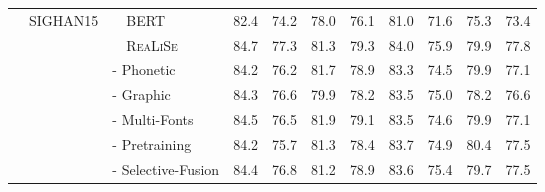 \documentclass[11pt,a4paper]{article}
\newcommand\model{\textsc{ReaLiSe}}
\begin{document}
\begin{table*}[t]
\begin{tabular}{@{}l|@{}l|cccc|cccc}
\midrule

\multirow{7}{*}{~~SIGHAN15} & ~~BERT & 82.4 & 74.2 & 78.0 & 76.1 & 81.0 & 71.6 & 75.3 & 73.4 \\
& ~~\model{} & 84.7 & 77.3 & 81.3 & 79.3 & 84.0 & 75.9 & 79.9 & 77.8 \\
& \quad- Phonetic & 84.2 & 76.2 & 81.7 & 78.9 & 83.3 & 74.5 & 79.9 & 77.1 \\
& \quad- Graphic & 84.3 & 76.6 & 79.9 & 78.2 & 83.5 & 75.0 & 78.2 & 76.6 \\
& \quad- Multi-Fonts & 84.5 & 76.5 & 81.9 & 79.1 & 83.5 & 74.6 & 79.9 & 77.1 \\
& \quad- Pretraining & 84.2 & 75.7 & 81.3 & 78.4 & 83.7 & 74.9 & 80.4 & 77.5 \\
& \quad- Selective-Fusion & 84.4 & 76.8 & 81.2 & 78.9 & 83.6 & 75.4 & 79.7 & 77.5 \\
\bottomrule
\end{tabular}
\caption{Ablation results of the \model{} model on each SIGHAN dataset.}
\label{tab:full-ablation}
\end{table*} 
\end{document}
